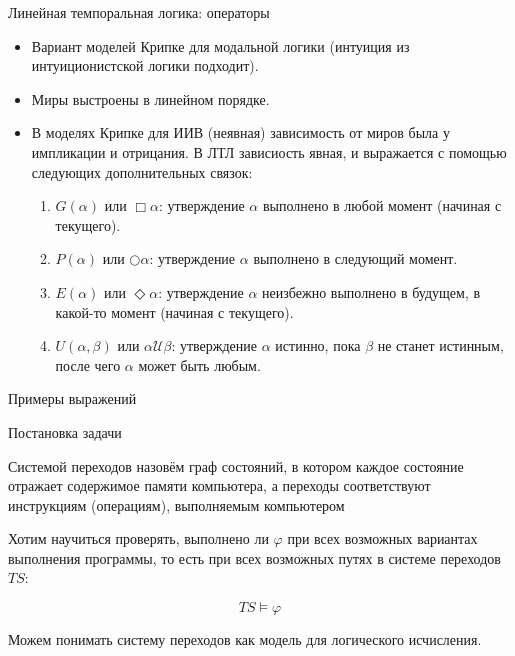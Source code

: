 \documentclass[aspectratio=169,dvipsnames,usenames]{beamer}
\begin{document}
\begin{frame}{Линейная темпоральная логика: операторы}
\begin{itemize}
\item Вариант моделей Крипке для модальной логики (интуиция из интуиционистской логики подходит).
\item Миры выстроены в линейном порядке.
\item В моделях Крипке для ИИВ (неявная) зависимость от миров была у импликации и отрицания.
В ЛТЛ зависиость явная, и выражается с помощью следующих дополнительных связок:
\begin{enumerate}
\item $G(\alpha)$ или $\Box\alpha$: утверждение $\alpha$ выполнено в любой момент (начиная с текущего).
\item $P(\alpha)$ или $\bigcirc\alpha$: утверждение $\alpha$ выполнено в следующий момент.
\item $E(\alpha)$ или $\Diamond\alpha$: утверждение $\alpha$ неизбежно выполнено в будущем, в какой-то момент (начиная с текущего).
\item $U(\alpha,\beta)$ или $\alpha\mathcal{U}\beta$: утверждение $\alpha$ истинно, пока $\beta$ не станет истинным,
после чего $\alpha$ может быть любым.
\end{enumerate}
\end{itemize}
\end{frame}

\begin{frame}{Примеры выражений}
\end{frame}

\begin{frame}{Постановка задачи}
\begin{dfn}Системой переходов назовём граф состояний, в котором каждое состояние отражает
содержимое памяти компьютера, а переходы соответствуют инструкциям (операциям), выполняемым
компьютером\end{dfn}

Хотим научиться проверять, выполнено ли $\varphi$ при всех возможных вариантах выполнения программы,
то есть при всех возможных путях в системе переходов $TS$:

$$TS \models \varphi$$

Можем понимать систему переходов как модель для логического исчисления.
\end{frame}
\end{document}
